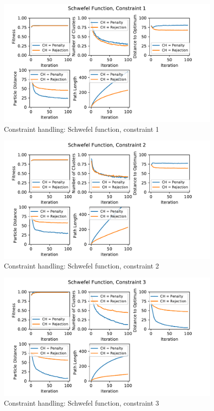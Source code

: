 \documentclass[12pt]{article}
\begin{document}
\begin{figure}[h!]
	\centering
	\includegraphics[width=1\textwidth]{figures/ex6/ex6-3-Constraint_1.pdf}
	\caption{Constraint handling: Schwefel function, constraint 1}
	\label{fig:ex6-3-1}
\end{figure}
\begin{figure}[h!]
	\centering
	\includegraphics[width=1\textwidth]{figures/ex6/ex6-3-Constraint_2.pdf}
	\caption{Constraint handling: Schwefel function, constraint 2}
	\label{fig:ex6-3-2}
\end{figure}
\begin{figure}[h!]
	\centering
	\includegraphics[width=1\textwidth]{figures/ex6/ex6-3-Constraint_3.pdf}
	\caption{Constraint handling: Schwefel function, constraint 3}
	\label{fig:ex6-3-3}
\end{figure}
\end{document}
